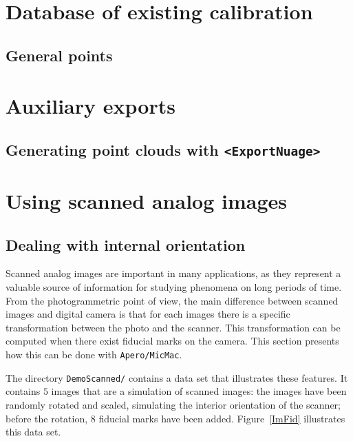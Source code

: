 
\section{Database of existing calibration}

\label{DB:Calib}
\subsection{General points}


\section{Auxiliary exports}


\subsection{Generating point clouds with {\tt <ExportNuage>}}

\label{Ap:Exp:Nuage}



\section{Using scanned analog images}

\subsection{Dealing with internal orientation}

\label{Analog:Image}
Scanned analog images are important in many applications, as they represent
a valuable source of information for studying phenomena on long periods of time.
From the photogrammetric point of view, the main difference between
scanned images and digital camera is that for each images there
is a specific  transformation between the photo and the scanner.
This transformation can be computed when there exist fiducial marks
on the camera. This section presents how this can be done with {\tt Apero/MicMac}.


The directory {\tt DemoScanned/} contains a data set that illustrates these
features. It contains $5$ images that are a simulation of scanned
images: the images have been randomly rotated and scaled, simulating the
interior orientation of the scanner; before the rotation, $8$  fiducial marks have
been added. Figure~\ref{ImFid} illustrates this data set.


